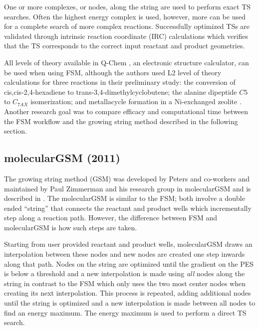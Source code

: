 \documentclass[preprint, 11pt]{elsarticle} %
\begin{document}
One or more complexes, or nodes, along the string are used to perform exact TS searches.
Often the highest energy complex is used, however, more can be used for a complete search of more complex reactions. 
Successfully optimized TSs are validated through intrinsic reaction coordinate (IRC) calculations \cite{Maeda:2015} which verifies that the TS corresponds to the correct input reactant and product geometries. 

All levels of theory available in Q-Chem \cite{QChem:2015}, an electronic structure calculator, can be used when using FSM, although the authors used L2 level of theory calculations for three reactions in their preliminary study: the conversion of cis,cis-2,4-hexadiene to trans-3,4-dimethylcyclobutene; the alanine dipeptide $C5$ to $C_{7AX}$ isomerization; and metallacycle formation in a Ni-exchanged zeolite \cite{Behn:2011}. %
Another research goal was to compare efficacy and computational time between the FSM workflow and the growing string method described in the following section.

\subsection{molecularGSM (2011)}

The growing string method (GSM) was developed by Peters and co-workers \cite{Peters:2004} and maintained by Paul Zimmerman and his research group in molecularGSM \cite{Zimmerman:2013jctc,Zimmerman:2013jcp, Zimmerman:2015jcc} and is described in .
The molecularGSM is similar to the FSM; both involve a double ended ``string'' that connects the reactant and product wells which incrementally step along a reaction path.
However, the difference between FSM and molecularGSM is how such steps are taken. 

Starting from user provided reactant and product wells, molecularGSM draws an interpolation between these nodes and new nodes are created one step inwards along that path. 
Nodes on the string are optimized until the gradient on the PES is below a threshold and a new interpolation is made using \textit{all} nodes along the string in contrast to the FSM which only uses the two most center nodes when creating its next interpolation.
This process is repeated, adding additional nodes until the string is optimized and a new interpolation is made between all nodes to find an energy maximum. 
The energy maximum is used to perform a direct TS search.
\end{document}
